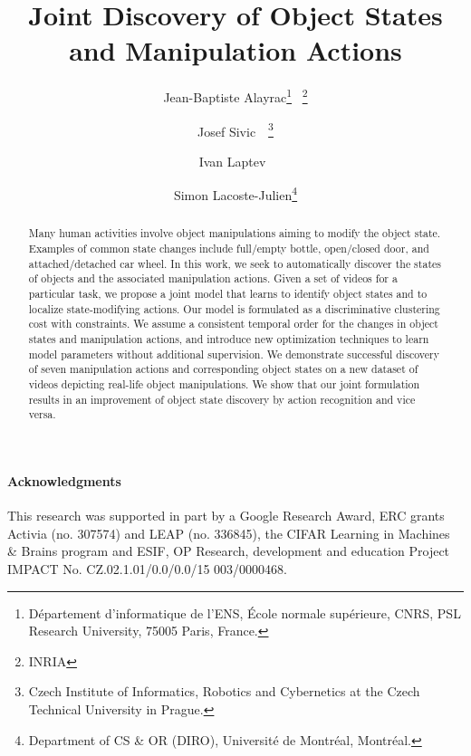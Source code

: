 \documentclass[10pt,twocolumn,letterpaper]{article}
\begin{document}
\title{Joint Discovery of Object States and Manipulation Actions}
\author{
Jean-Baptiste Alayrac\thanks{D\'{e}partement d’informatique de l'ENS, \'{E}cole normale sup\'{e}rieure, CNRS, PSL Research University, 75005
	Paris, France.} \ \thanks{INRIA}
\and
Josef Sivic\footnotemark[1] \ \footnotemark[2] \ \thanks{Czech Institute of Informatics, Robotics and Cybernetics at the
Czech Technical University in Prague.}
\and
Ivan Laptev\footnotemark[1] \ \footnotemark[2]
\and
Simon Lacoste-Julien\thanks{Department of CS \& OR (DIRO), Universit\'{e} de Montr\'{e}al, Montr\'{e}al.}
}
\maketitle
\begin{abstract}
Many human activities involve object manipulations aiming to modify the object state.
Examples of common state changes include full/empty bottle, open/closed door, and attached/detached car wheel.
In this work, we seek to automatically discover the states of objects and the associated manipulation actions.
Given a set of videos for a particular task, we propose a joint model that learns to identify object states and to localize state-modifying actions.
Our model is formulated as a discriminative clustering cost with constraints.
We assume a consistent temporal order for the changes in object states and manipulation actions, 
and introduce new optimization techniques to learn model parameters without additional supervision.
We demonstrate successful discovery of seven manipulation actions and corresponding object states on a new dataset of videos depicting real-life object manipulations.
We show that our joint formulation results in an improvement of object state discovery by action recognition and vice versa.
%
%
%
%
%
%
%
%
%
\end{abstract}






\footnotesize{
	\paragraph{Acknowledgments}
	This research was supported in part by a Google Research Award, ERC grants Activia (no. 307574) and LEAP (no. 336845), the CIFAR Learning in Machines \& Brains program and ESIF, OP Research, development and education Project IMPACT No. CZ.02.1.01/0.0/0.0/15 003/0000468.
}


{\small


}
\end{document}
